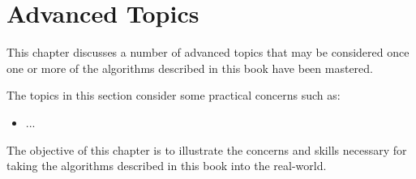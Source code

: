 

\renewcommand{\bibsection}{\subsection{\bibname}}
\chapter{Advanced Topics}
\label{ch:advanced}
This chapter discusses a number of advanced topics that may be considered once one or more of the algorithms described in this book have been mastered.

The topics in this section consider some practical concerns such as: 

\begin{itemize}
  \item ...
\end{itemize}

The objective of this chapter is to illustrate the concerns and skills necessary for taking the algorithms described in this book into the real-world.

\newpage\begin{bibunit}\putbib\end{bibunit}
\newpage\begin{bibunit}\putbib\end{bibunit}
\newpage\begin{bibunit}\putbib\end{bibunit}
\newpage\begin{bibunit}\putbib\end{bibunit}

